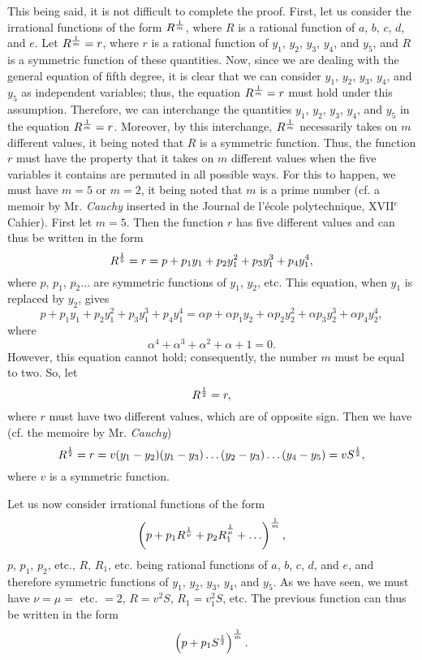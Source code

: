 \documentclass[oneside, 12 pt, leqno]{memoir}
\let\oldfrac\frac
\def\frac#1#2{\mathchoice{\text{\scalebox{.83}{${\oldfrac{#1}{#2}}$}}}{\text{\scalebox{.83}{${\displaystyle\oldfrac{#1}{#2}}$}}}{\genfrac{}{}{}{2}{#1}{#2}}{\genfrac{}{}{}{3}{#1}{#2}}}
\begin{document}
This being said, it is not difficult to complete the proof. First, let us consider the irrational functions of the form \(R^{\frac{1}{m}}\), where \(R\) is a rational function of \(a\), \(b\), \(c\), \(d\), and \(e\). Let \(R^{\frac{1}{m}} = r\), where \(r\) is a rational function of \(y_1\), \(y_2\), \(y_3\), \(y_4\), and \(y_5\), and \(R\) is a symmetric function of these quantities. Now, since we are dealing with the general equation of fifth degree, it is clear that we can consider \(y_1\), \(y_2\), \(y_3\), \(y_4\), and \(y_5\) as independent variables; thus, the equation \(R^{\frac{1}{m}} = r\) must hold under this assumption. Therefore, we can interchange the quantities \(y_1\), \(y_2\), \(y_3\), \(y_4\), and \(y_5\) in the equation \(R^{\frac{1}{m}} = r\). Moreover, by this interchange, \(R^{\frac{1}{m}}\) necessarily takes on \(m\) different values, it being noted that \(R\) is a symmetric function. Thus, the function \(r\) must have the property that it takes on \(m\) different values when the five variables it contains are permuted in all possible ways. For this to happen, we must have \(m = 5\) or \(m = 2\), it being noted that \(m\) is a prime number (cf. a memoir by Mr. \textit{Cauchy} inserted in the Journal de l'école polytechnique, XVII\(^{e}\) Cahier). First let \(m = 5\). Then the function \(r\) has five different values and can thus be written in the form
\[R^{\frac{1}{5}} = r = p + p_1 y_1 + p_2 y_1^2 + p_3 y_1^3 + p_4 y_1^4,\]
where \(p\), \(p_1\), \(p_2 \ldots\) are symmetric functions of \(y_1\), \(y_2\), etc. This equation, when \(y_1\) is replaced by \(y_2\), gives
\[p + p_1 y_1 + p_2 y_1^2 + p_3 y_1^3 + p_4 y_1^4 = \alpha p + \alpha p_1 y_2 + \alpha p_2 y_2^2 + \alpha p_3 y_2^3 + \alpha p_4 y_2^4,\]
where
\[\alpha^4 + \alpha^3 + \alpha^2 + \alpha + 1 = 0.\]
However, this equation cannot hold; consequently, the number \(m\) must be equal to two.  So, let
\[R^{\frac{1}{2}} = r,\]
where \(r\) must have two different values, which are of opposite sign. Then we have (cf. the memoire by Mr. \textit{Cauchy})
\[R^{\frac{1}{2}} = r = v(y_1 - y_2)(y_1 - y_3) \ldots (y_2 - y_3) \ldots (y_4 - y_5) = v S^{\frac{1}{2}},\]
where \(v\) is a symmetric function.

Let us now consider irrational functions of the form
\[\left(p+p_1 R^{\frac{1}{\nu}}+p_2 R_1^{\frac{1}{\mu}}+\ldots\right)^{\frac{1}{m}},\]
\(p\), \(p_1\), \(p_2\), etc., \(R\), \(R_1\), etc. being rational functions of \(a\), \(b\), \(c\), \(d\), and \(e\), and therefore symmetric functions of \(y_1\), \(y_2\), \(y_3\), \(y_4\), and \(y_5\). As we have seen, we must have \(\nu=\mu=\) etc. \(=2\), \(R=v^2 S\), \(R_1=v_1^2 S\), etc. The previous function can thus be written in the form
\[\left(p+p_1 S^{\frac{1}{2}}\right)^{\frac{1}{m}}.\]
\end{document}
